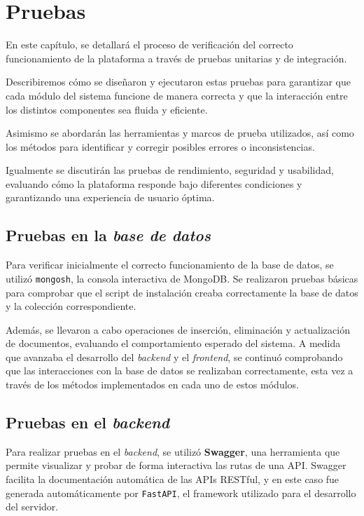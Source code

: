 \chapter{Pruebas}

En este capítulo, se detallará el proceso de verificación del correcto funcionamiento de la plataforma a través de pruebas unitarias y de integración. 

Describiremos cómo se diseñaron y ejecutaron estas pruebas para garantizar que cada módulo del sistema funcione de manera correcta y que la interacción entre los distintos componentes sea fluida y eficiente. 

Asimismo se abordarán las herramientas y marcos de prueba utilizados, así como los métodos para identificar y corregir posibles errores o inconsistencias. 

Igualmente se discutirán las pruebas de rendimiento, seguridad y usabilidad, evaluando cómo la plataforma responde bajo diferentes condiciones y garantizando una experiencia de usuario óptima.  

\newpage

\section{Pruebas en la \textit{base de datos}}

Para verificar inicialmente el correcto funcionamiento de la base de datos, se utilizó \texttt{mongosh}, la consola interactiva de MongoDB. Se realizaron pruebas básicas para comprobar que el script de instalación creaba correctamente la base de datos y la colección correspondiente.

Además, se llevaron a cabo operaciones de inserción, eliminación y actualización de documentos, evaluando el comportamiento esperado del sistema. A medida que avanzaba el desarrollo del \textit{backend} y el \textit{frontend}, se continuó comprobando que las interacciones con la base de datos se realizaban correctamente, esta vez a través de los métodos implementados en cada uno de estos módulos.

\newpage

\section{Pruebas en el \textit{backend}}

Para realizar pruebas en el \textit{backend}, se utilizó \textbf{Swagger}, una herramienta que permite visualizar y probar de forma interactiva las rutas de una API. Swagger facilita la documentación automática de las APIs RESTful, y en este caso fue generada automáticamente por \texttt{FastAPI}, el framework utilizado para el desarrollo del servidor.

